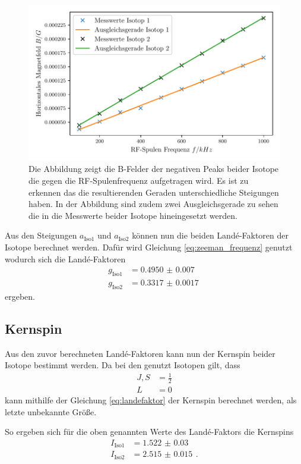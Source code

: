 \begin{figure}[H]
    \centering
    \includegraphics[width=\textwidth]{content/plots/landefaktor.pdf}
    \caption{Die Abbildung zeigt die B-Felder der negativen Peaks beider Isotope die gegen die RF-Spulenfrequenz aufgetragen wird.
    Es ist zu erkennen das die resultierenden Geraden unterschiedliche Steigungen haben.
    In der Abbildung sind zudem zwei Ausgleichsgerade zu sehen die in die Messwerte beider Isotope hineingesetzt werden.}
    \label{fig:lande}
\end{figure}
Aus den Steigungen $a_\text{Iso1}$ und $a_\text{Iso2}$ können nun die beiden Landé-Faktoren der Isotope berechnet werden.
Dafür wird Gleichung \eqref{eq:zeeman_frequenz} genutzt wodurch sich die Landé-Faktoren
\begin{align*}
    g_\text{Iso1} &= \SI{0.4950(70)}{}\\
    g_\text{Iso2} &= \SI{ 0.3317(17)}{}
\end{align*}
ergeben.
\subsection{Kernspin}
Aus den zuvor berechneten Landé-Faktoren kann nun der Kernspin beider Isotope bestimmt werden.
Da bei den genutzt Isotopen gilt, dass 
\begin{align*}
    J, S &= \frac{1}{2}\\
    L &= 0
\end{align*}
kann mithilfe der Gleichung \eqref{eq:landefaktor} der Kernspin berechnet werden, als letzte unbekannte Größe.

So ergeben sich für die oben genannten Werte des Landé-Faktors die Kernspins 
\begin{align*}
    I_\text{Iso1} &= \SI{1.522(30)}{}\\
    I_\text{Iso2} &= \SI{2.515(15)}{} \, .
\end{align*}

